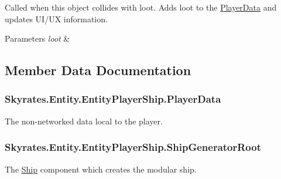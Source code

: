 Called when this object collides with loot. Adds loot to the \hyperlink{class_skyrates_1_1_entity_1_1_entity_player_ship_a9dff4c7af9e4872a6bd58b821d12d3df}{Player\-Data} and updates U\-I/\-U\-X information. 


\begin{DoxyParams}{Parameters}
{\em loot} & \\
\hline
\end{DoxyParams}


\subsection{Member Data Documentation}
\hypertarget{class_skyrates_1_1_entity_1_1_entity_player_ship_a9dff4c7af9e4872a6bd58b821d12d3df}{
\subsubsection[{Player\-Data}]{ Skyrates.\-Entity.\-Entity\-Player\-Ship.\-Player\-Data}}\label{class_skyrates_1_1_entity_1_1_entity_player_ship_a9dff4c7af9e4872a6bd58b821d12d3df}


The non-\/networked data local to the player. 

\hypertarget{class_skyrates_1_1_entity_1_1_entity_player_ship_abec0fc0c6cc3462c7019ac48b74879ca}{
\subsubsection[{Ship\-Generator\-Root}]{ Skyrates.\-Entity.\-Entity\-Player\-Ship.\-Ship\-Generator\-Root}}\label{class_skyrates_1_1_entity_1_1_entity_player_ship_abec0fc0c6cc3462c7019ac48b74879ca}


The \hyperlink{namespace_skyrates_1_1_ship}{Ship} component which creates the modular ship. 



